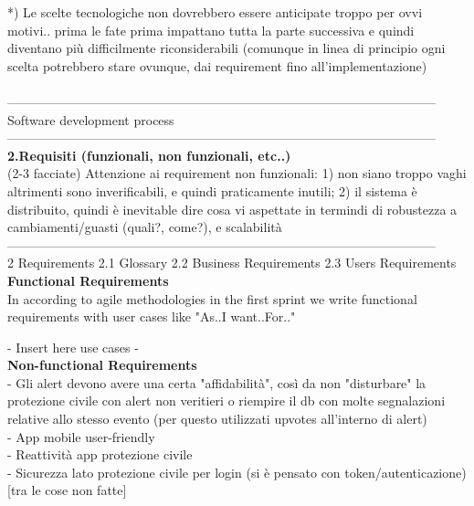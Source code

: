 \documentclass[10pt,english]{article}
\begin{document}
*) Le scelte tecnologiche non dovrebbero essere anticipate troppo per ovvi motivi.. prima le fate prima impattano tutta la parte successiva e quindi diventano più difficilmente riconsiderabili (comunque in linea di principio ogni scelta potrebbero stare ovunque, dai requirement fino all'implementazione) \\
\\-----------------------------------------------------------------------------------------------------\\
Software development process
\\-----------------------------------------------------------------------------------------------------\\
\textbf{2.Requisiti (funzionali, non funzionali, etc..)} \\
(2-3 facciate)
Attenzione ai requirement non funzionali: 1) non siano troppo vaghi altrimenti sono inverificabili, e quindi praticamente inutili; 2) il sistema è distribuito, quindi è inevitable dire cosa vi aspettate in termindi di robustezza a cambiamenti/guasti (quali?, come?), e scalabilità
\\-----------------------------------------------------------------------------------------------------\\

2 Requirements 
2.1 Glossary 
2.2 Business Requirements 
2.3 Users Requirements \\

\textbf{Functional Requirements}\\

In according to agile methodologies in the first sprint we write functional requirements with user cases like "As..I want..For.."

- Insert here use cases -\\ 


\textbf{Non-functional Requirements}\\
- Gli alert devono avere una certa "affidabilità", così da non "disturbare" la protezione civile con alert non veritieri o riempire il db con molte segnalazioni relative allo stesso evento (per questo utilizzati upvotes all'interno di alert)\\

- App mobile user-friendly\\

- Reattività app protezione civile\\

- Sicurezza lato protezione civile per login (si è pensato con token/autenticazione) [tra le cose non fatte]
\end{document}
